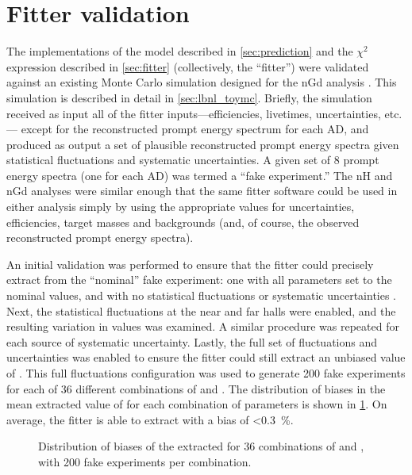 \section{Fitter validation}
\label{sec:fitter_validation}

The implementations of the model described in \cref{sec:prediction}
and the $\chi^2$ expression described in \cref{sec:fitter}
(collectively, the ``fitter'')
were validated against an existing Monte Carlo simulation
designed for the nGd analysis \cite{lbnl_toymc}.
This simulation is described in detail in \cref{sec:lbnl_toymc}.
Briefly, the simulation received as input
all of the fitter inputs---efficiencies, livetimes, uncertainties, etc.---%
except for the reconstructed prompt energy spectrum for each AD,
and produced as output a set of plausible reconstructed prompt energy spectra
given statistical fluctuations and systematic uncertainties.
A given set of 8 prompt energy spectra (one for each AD)
was termed a ``fake experiment.''
The nH and nGd analyses were similar enough
that the same fitter software could be used in either analysis
simply by using the appropriate values for uncertainties, efficiencies,
target masses and backgrounds
(and, of course, the observed reconstructed prompt energy spectra).

An initial validation was performed to ensure that
the fitter could precisely extract \thetaot{}
from the ``nominal'' fake experiment:
one with all parameters set to the nominal values,
and with no statistical fluctuations or systematic uncertainties .
Next, the statistical fluctuations at the near and far halls were enabled,
and the resulting variation in \thetaot{} values was examined.
A similar procedure was repeated for each source of systematic uncertainty.
Lastly, the full set of fluctuations and uncertainties was enabled
to ensure the fitter could still extract an unbiased value of \thetaot{}.
This full fluctuations configuration was used to generate
200 fake experiments for each of 36 different combinations
of \thetaot{} and \dmee{}.
The distribution of biases in the mean extracted value of \thetaot{}
for each combination of parameters
is shown in \cref{fig:final_validation}.
On average, the fitter is able to extract \thetaot{}
with a bias of \SI{<0.3}{\percent}.

\begin{figure}
    \caption{
        Distribution of biases of the extracted \thetaot{}
        for 36 combinations of \thetaot{} and \dmee{},
        with 200 fake experiments per combination.
    }
    \label{fig:final_validation}
\end{figure}

